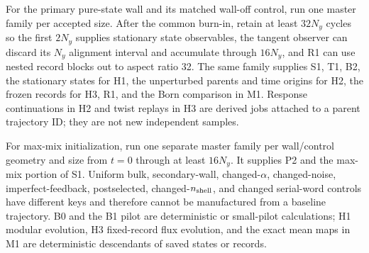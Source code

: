 \documentclass[aps,prx,onecolumn,nofootinbib,superscriptaddress,longbibliography]{revtex4-2}
\begin{document}
For the primary pure-state wall and its matched wall-off control, run one master family per
accepted size.  After the common burn-in, retain at least $32N_y$ cycles so the first
$2N_y$ supplies stationary state observables, the tangent observer can discard its $N_y$
alignment interval and accumulate through $16N_y$, and R1 can use nested record blocks out
to aspect ratio 32.  The same family supplies S1, T1, B2, the stationary states for H1,
the unperturbed parents and time origins for H2, the frozen records for H3, R1, and the Born
comparison in M1.  Response continuations in H2 and twist replays in H3 are derived jobs
attached to a parent trajectory ID; they are not new independent samples.

For max-mix initialization, run one separate master family per wall/control geometry and
size from $t=0$ through at least $16N_y$.  It supplies P2 and the max-mix portion of S1.
Uniform bulk, secondary-wall, changed-$\alpha$, changed-noise, imperfect-feedback,
postselected, changed-$n_{\rm shell}$, and changed serial-word controls have different keys
and therefore cannot be manufactured from a baseline trajectory.  B0 and the B1 pilot are
deterministic or small-pilot calculations; H1 modular evolution, H3 fixed-record flux
evolution, and the exact mean maps in M1 are deterministic descendants of saved states or
records.
\end{document}

